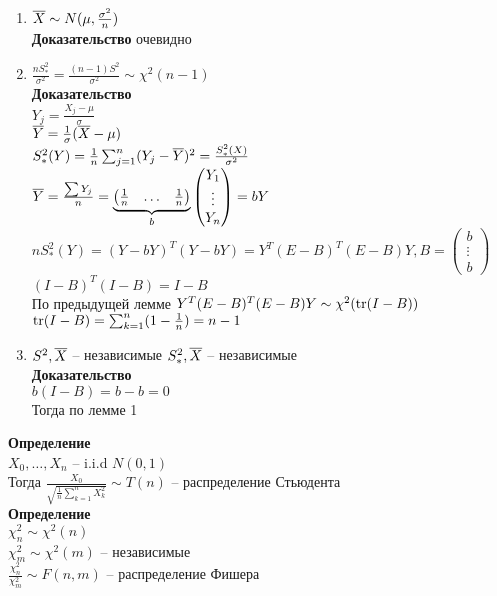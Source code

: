 \documentclass[12pt]{article}
\begin{document}
\begin{enumerate}
	\item $\ol X \sim N(\mu, \frac{\sigma^2}{n})$\\
	\textbf{Доказательство} очевидно
	\item $\frac{nS^2_*}{\sigma^2} = \frac{(n-1)S^2}{\sigma^2} \sim \chi^2 (n-1)$\\
	\textbf{Доказательство}\\
	$Y_j = \frac{X_j - \mu}{\sigma}$\\
	$\ol Y = \frac1\sigma (\ol X - \mu)$\\
	$S_*^2(Y) = \frac1n \sum_{j=1}^n (Y_j - \ol Y)^2 = \frac{S_*^2 (X)}{\sigma^2}$\\
	$\ol Y = \frac{\sum Y_j}{n} = \ub b{\begin{pmatrix}
		\frac{1}{n} & \ldots & \frac{1}{n}
	\end{pmatrix}} \begin{pmatrix}
		Y_1 \\
		\vdots\\
		Y_n
	\end{pmatrix} = bY$\\
	$n S_*^2 (Y) = (Y-bY)^T (Y-bY) = Y^T (E-B)^T(E-B)Y, B = \begin{pmatrix}
		b \\ \vdots \\ b
	\end{pmatrix}$\\
	$(I-B)^T(I-B) = I - B$\\
	По предыдущей лемме $Y^T (E-B)^T(E-B)Y \sim \chi^2(\tr (I-B))$\\
	$\tr (I-B) = \sum_{k=1}^n (1-\frac1n) = n - 1$
	\item $S^2, \ol X $ -- независимые
	$S^2_*, \ol X$ -- независимые\\
	\textbf{Доказательство}\\
	$b(I - B) = b - b = 0$\\
	Тогда по лемме 1
\end{enumerate}
\textbf{Определение}\\
$X_0, \ldots, X_n$ -- i.i.d $N(0,1)$\\
Тогда $\frac{X_0}{\sqrt{\frac1n \sum_{k=1}^n X_k^2}} \sim T(n)$ -- распределение Стьюдента\\
\textbf{Определение}\\
$\chi_n^2 \sim \chi^2(n)$\\
$\chi_m^2 \sim \chi^2(m)$ -- независимые\\
$\frac{\chi_n^2}{\chi_m^2} \sim F(n,m)$ -- распределение Фишера\\
\end{document}
